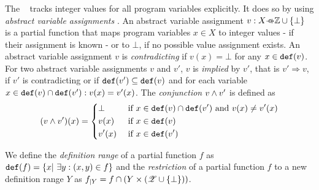\subsubsection{\ValueAnalysisCPA}\label{sec:valueAnalysis}
The \ \cite{Beyer2013} \cite{Beyer2015} tracks integer values for all program variables explicitly.
It does so by using \emph{abstract variable assignments} \cite{Beyer2013}. An abstract variable assignment $v: X \partialFunc \integerset \cup \{\bot\}$ is a partial function that maps program variables $x \in X$ to integer values - if their assignment is known - or to $\bot$, if no possible value assignment exists.
An abstract variable assignment $v$ is \emph{contradicting} if $v(x) = \bot$ for any $x \in \texttt{def}(v)$.
For two abstract variable assignments $v$ and $v'$, $v$ is \emph{implied} by $v'$, that is $v' \Rightarrow v$, if $v'$ is contradicting or if $\texttt{def}(v') \subseteq \texttt{def}(v)$ and for each variable $x \in \texttt{def}(v) \cap \texttt{def}(v') : v(x) = v'(x)$.
The \emph{conjunction} $v \wedge v'$ is defined as
\[(v \wedge v')(x) = \begin{dcases}
	\bot & \text{ if } x \in \texttt{def}(v) \cap \texttt{def}(v') \text{ and } v(x) \neq v'(x)\\
	v(x) & \text{ if } x \in \texttt{def}(v)\\
	v'(x) & \text{ if } x \in \texttt{def}(v')
\end{dcases}\]

We define the \emph{definition range} of a partial function $f$ as $\texttt{def}(f) = \{ x |\ \exists y : (x, y) \in f \}$ and
the \emph{restriction} of a partial function $f$ to a new definition range $Y$ as $f_{|Y} = f \cap ( Y \times (\mathscr{Z} \cup \{ \bot \}))$.

